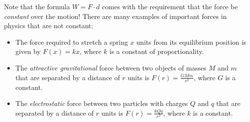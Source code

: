 \documentclass{ximera}
\begin{document}
\begin{remark}
Note that the formula $W=F \cdot d$ comes with the requirement that the force be \emph{constant} over the motion!  There are many examples of important forces in physics that are not constant:

\begin{itemize}
\item The force required to stretch a spring $x$ units from its equilibrium position is given by $F(x) = k x$, where $k$ is a constant of proportionality.
\item The \emph{attractive gravitational} force between two objects of masses $M$ and $m$ that are separated by a distance of $r$ units  is $F(r) = \frac{GMm}{r^2}$, where $G$ is a constant.  
\item The \emph{electrostatic} force between two particles with charges $Q$ and $q$ that are separated by a distance of $r$ units  is $F(r) = \frac{kQq}{r^2}$, where $k$ is a constant.
\end{itemize}
\end{remark}
%
%
%
\end{document}
